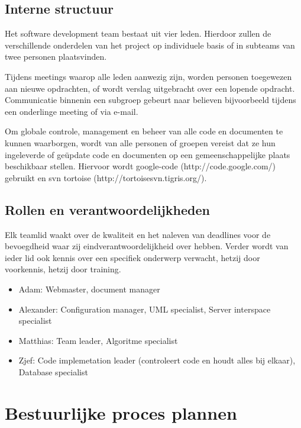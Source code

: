 \documentclass{article}
\begin{document}
\subsection{Interne structuur}

Het software development team bestaat uit vier leden. Hierdoor zullen de verschillende onderdelen van het project op individuele basis of in subteams  van twee personen plaatsvinden.

Tijdens meetings waarop alle leden aanwezig zijn, worden personen toegewezen aan nieuwe opdrachten, of wordt verslag uitgebracht over een lopende opdracht.
Communicatie binnenin een subgroep gebeurt naar believen bijvoorbeeld tijdens een onderlinge meeting of via e-mail.

Om globale controle, management en beheer van alle code en documenten te kunnen waarborgen, wordt van alle personen of groepen vereist dat ze hun ingeleverde of ge\"{u}pdate code en documenten op een gemeenschappelijke plaats beschikbaar stellen.
Hiervoor wordt google-code (http://code.google.com/) gebruikt en svn tortoise (http://tortoisesvn.tigris.org/).

\subsection{Rollen en verantwoordelijkheden}

Elk teamlid waakt over de kwaliteit en het naleven van deadlines voor de bevoegdheid waar zij eindverantwoordelijkheid over hebben.
Verder wordt van ieder lid ook kennis over een specifiek onderwerp verwacht, hetzij door voorkennis, hetzij door training.

\begin{itemize}
\item[] Adam: Webmaster, document manager \\[-5mm]
\item[] Alexander: Configuration manager, UML specialist, Server interspace specialist \\[-5mm]
\item[] Matthias: Team leader, Algoritme specialist \\[-5mm]
\item[] Zjef: Code implemetation leader (controleert code en houdt alles bij elkaar), Database specialist \\[-5mm]
\end{itemize}
 
\newpage
\section{Bestuurlijke proces plannen}
\end{document}
